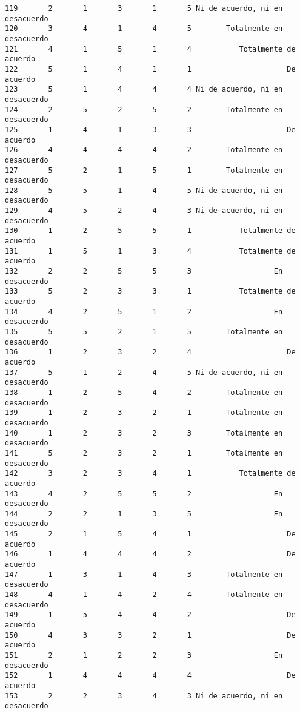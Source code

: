 \documentclass[
  letterpaper,
  DIV=11,
  numbers=noendperiod]{scrartcl}
\begin{document}
\begin{verbatim}
119       2       1       3       1       5 Ni de acuerdo, ni en desacuerdo
120       3       4       1       4       5        Totalmente en desacuerdo
121       4       1       5       1       4           Totalmente de acuerdo
122       5       1       4       1       1                      De acuerdo
123       5       1       4       4       4 Ni de acuerdo, ni en desacuerdo
124       2       5       2       5       2        Totalmente en desacuerdo
125       1       4       1       3       3                      De acuerdo
126       4       4       4       4       2        Totalmente en desacuerdo
127       5       2       1       5       1        Totalmente en desacuerdo
128       5       5       1       4       5 Ni de acuerdo, ni en desacuerdo
129       4       5       2       4       3 Ni de acuerdo, ni en desacuerdo
130       1       2       5       5       1           Totalmente de acuerdo
131       1       5       1       3       4           Totalmente de acuerdo
132       2       2       5       5       3                   En desacuerdo
133       5       2       3       3       1           Totalmente de acuerdo
134       4       2       5       1       2                   En desacuerdo
135       5       5       2       1       5        Totalmente en desacuerdo
136       1       2       3       2       4                      De acuerdo
137       5       1       2       4       5 Ni de acuerdo, ni en desacuerdo
138       1       2       5       4       2        Totalmente en desacuerdo
139       1       2       3       2       1        Totalmente en desacuerdo
140       1       2       3       2       3        Totalmente en desacuerdo
141       5       2       3       2       1        Totalmente en desacuerdo
142       3       2       3       4       1           Totalmente de acuerdo
143       4       2       5       5       2                   En desacuerdo
144       2       2       1       3       5                   En desacuerdo
145       2       1       5       4       1                      De acuerdo
146       1       4       4       4       2                      De acuerdo
147       1       3       1       4       3        Totalmente en desacuerdo
148       4       1       4       2       4        Totalmente en desacuerdo
149       1       5       4       4       2                      De acuerdo
150       4       3       3       2       1                      De acuerdo
151       2       1       2       2       3                   En desacuerdo
152       1       4       4       4       4                      De acuerdo
153       2       2       3       4       3 Ni de acuerdo, ni en desacuerdo

\end{verbatim}
\end{document}
